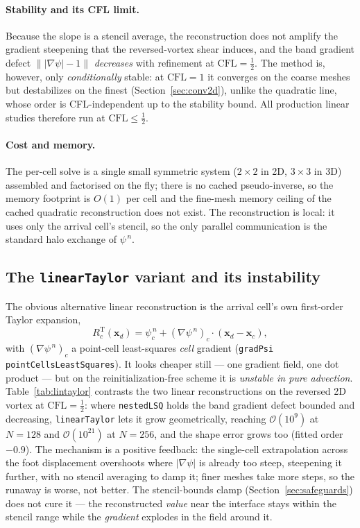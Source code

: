 \documentclass[preprint,3p,11pt]{elsarticle}
\newcommand{\psilev}{\psi}
\newcommand{\xc}{\mathbf{x}_c}
\newcommand{\xd}{\mathbf{x}_d}
\begin{document}
\paragraph{Stability and its CFL limit.} Because the slope is a stencil
average, the reconstruction does not amplify the gradient steepening that the
reversed-vortex shear induces, and the band gradient defect
$\bigl\||\nabla\psilev|-1\bigr\|$ \emph{decreases} with refinement at
$\mathrm{CFL}=\tfrac12$. The method is, however, only \emph{conditionally}
stable: at $\mathrm{CFL}=1$ it converges on the coarse meshes but
destabilizes on the finest (Section~\ref{sec:conv2d}), unlike the quadratic
line, whose order is CFL-independent up to the stability bound. All
production linear studies therefore run at $\mathrm{CFL}\le\tfrac12$.

\paragraph{Cost and memory.} The per-cell solve is a single small symmetric
system ($2\times2$ in 2D, $3\times3$ in 3D) assembled and factorised on the
fly; there is no cached pseudo-inverse, so the memory footprint is $O(1)$ per
cell and the fine-mesh memory ceiling of the cached quadratic reconstruction
does not exist. The reconstruction is local: it uses only the arrival cell's
stencil, so the only parallel communication is the standard halo exchange of
$\psilev^{\,n}$.

\subsection{The \texttt{linearTaylor} variant and its instability}
\label{sec:lintaylor}
The obvious alternative linear reconstruction is the arrival cell's own
first-order Taylor expansion,
\begin{equation}
  R_c^{\mathrm{T}}(\xd) = \psilev^{\,n}_c + (\nabla\psilev^{\,n})_c\cdot(\xd-\xc),
  \label{eq:lintaylor}
\end{equation}
with $(\nabla\psilev^{\,n})_c$ a point-cell least-squares \emph{cell} gradient
(\texttt{gradPsi pointCellsLeastSquares}). It looks cheaper still --- one
gradient field, one dot product --- but on the reinitialization-free scheme it
is \emph{unstable in pure advection}. Table~\ref{tab:lintaylor} contrasts the
two linear reconstructions on the reversed 2D vortex at $\mathrm{CFL}=\tfrac12$:
where \texttt{nestedLSQ} holds the band gradient defect bounded and decreasing,
\texttt{linearTaylor} lets it grow geometrically, reaching $\mathcal{O}(10^{9})$
at $N=128$ and $\mathcal{O}(10^{21})$ at $N=256$, and the shape error grows too
(fitted order $-0.9$). The mechanism is a positive feedback: the single-cell
extrapolation across the foot displacement overshoots where $|\nabla\psilev|$
is already too steep, steepening it further, with no stencil averaging to damp
it; finer meshes take more steps, so the runaway is worse, not better. The
stencil-bounds clamp (Section~\ref{sec:safeguards}) does not cure it --- the
reconstructed \emph{value} near the interface stays within the stencil range
while the \emph{gradient} explodes in the field around it.
\end{document}

